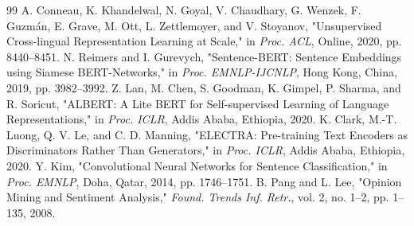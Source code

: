 \documentclass[conference]{IEEEtran}
\begin{document}
\begin{thebibliography}{99}
A. Conneau, K. Khandelwal, N. Goyal, V. Chaudhary, G. Wenzek, F. Guzmán, E. Grave, M. Ott, L. Zettlemoyer, and V. Stoyanov, "Unsupervised Cross-lingual Representation Learning at Scale," in \textit{Proc. ACL}, Online, 2020, pp. 8440–8451.
N. Reimers and I. Gurevych, "Sentence-BERT: Sentence Embeddings using Siamese BERT-Networks," in \textit{Proc. EMNLP-IJCNLP}, Hong Kong, China, 2019, pp. 3982–3992.
Z. Lan, M. Chen, S. Goodman, K. Gimpel, P. Sharma, and R. Soricut, "ALBERT: A Lite BERT for Self-supervised Learning of Language Representations," in \textit{Proc. ICLR}, Addis Ababa, Ethiopia, 2020.
K. Clark, M.-T. Luong, Q. V. Le, and C. D. Manning, "ELECTRA: Pre-training Text Encoders as Discriminators Rather Than Generators," in \textit{Proc. ICLR}, Addis Ababa, Ethiopia, 2020.
Y. Kim, "Convolutional Neural Networks for Sentence Classification," in \textit{Proc. EMNLP}, Doha, Qatar, 2014, pp. 1746–1751.
B. Pang and L. Lee, "Opinion Mining and Sentiment Analysis," \textit{Found. Trends Inf. Retr.}, vol. 2, no. 1–2, pp. 1–135, 2008.
\end{thebibliography}
\end{document}

